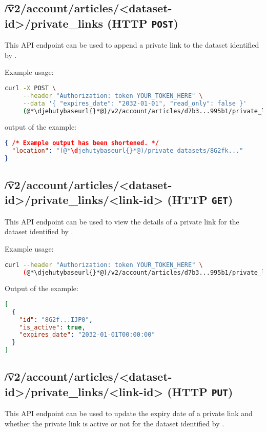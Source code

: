\subsection{\t{/v2/account/articles/<dataset-id>/private\_links} (HTTP \texttt{POST})}

  This API endpoint can be used to append a private link to the dataset
  identified by .

  Example usage:
\begin{lstlisting}[language=bash]
curl -X POST \
     --header "Authorization: token YOUR_TOKEN_HERE" \
     --data '{ "expires_date": "2032-01-01", "read_only": false }'
     (@*\djehutybaseurl{}*@)/v2/account/articles/d7b3...995b1/private_links | jq
\end{lstlisting}

  output of the example:
\begin{lstlisting}[language=JSON]
{ /* Example output has been shortened. */
  "location": "(@*\djehutybaseurl{}*@)/private_datasets/8G2fk..."
}
\end{lstlisting}

\subsection{\t{/v2/account/articles/<dataset-id>/private\_links/<link-id>} (HTTP \texttt{GET})}

  This API endpoint can be used to view the details of a private link for
  the dataset identified by .

  Example usage:
\begin{lstlisting}[language=bash]
curl --header "Authorization: token YOUR_TOKEN_HERE" \
     (@*\djehutybaseurl{}*@)/v2/account/articles/d7b3...995b1/private_links/8G2fk... | jq
\end{lstlisting}

  Output of the example:
\begin{lstlisting}[language=JSON]
[
  {
    "id": "8G2f...IJP0",
    "is_active": true,
    "expires_date": "2032-01-01T00:00:00"
  }
]
\end{lstlisting}

\subsection{\t{/v2/account/articles/<dataset-id>/private\_links/<link-id>} (HTTP \texttt{PUT})}

  This API endpoint can be used to update the expiry date of a private link
  and whether the private link is active or not for the dataset identified
  by .

